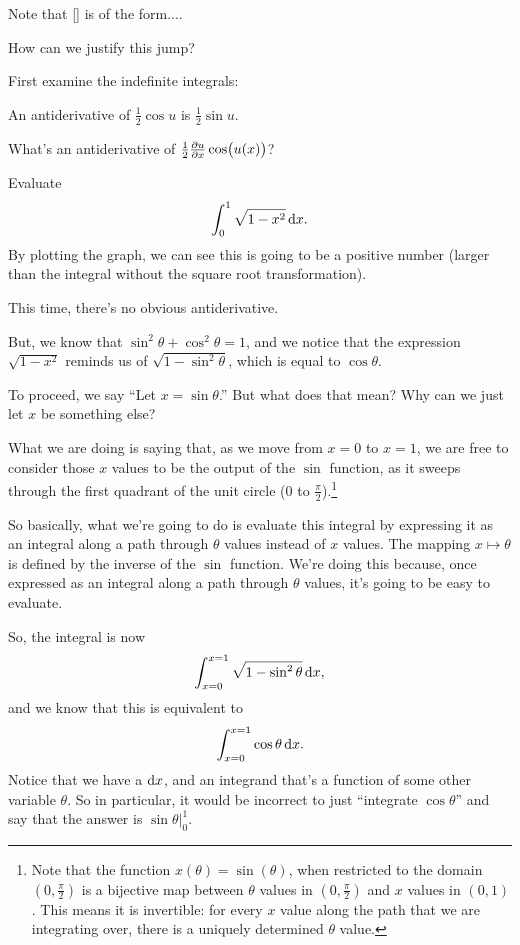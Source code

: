 \begin{example}
  Note that \eqref{} is of the form....

  How can we justify this jump?

  First examine the indefinite integrals:

  An antiderivative of $\frac{1}{2}\cos u$ is $\frac{1}{2}\sin u$.

  What's an antiderivative of $\frac{1}{2} \frac{\partial u}{\partial x} \cos(u(x))$?
\end{example}



\begin{example}
  Evaluate
  \begin{align*}
     \int _{0}^{1} \sqrt {1-x^{2}} \dx.
  \end{align*}
  By plotting the graph, we can see this is going to be a positive number (larger than the integral
  without the square root transformation).

  This time, there's no obvious antiderivative.

  But, we know that $\sin^2 \theta + \cos^2 \theta = 1$, and we notice that the expression
  $\sqrt{1 - x^2}$ reminds us of $\sqrt{1 - \sin^2 \theta}$, which is equal to $\cos \theta$.

  To proceed, we say ``Let $x = \sin \theta$.'' But what does that mean? Why can we just let $x$ be something else?

  What we are doing is saying that, as we move from $x=0$ to $x = 1$, we are free to consider those
  $x$ values to be the output of the $\sin$ function, as it sweeps through the first quadrant of the
  unit circle ($0$ to $\frac{\pi}{2}$).\footnote{Note that the function $x(\theta) = \sin(\theta)$, when restricted to the domain
    $(0, \frac{\pi}{2})$ is a bijective map between $\theta$ values in $(0, \frac{\pi}{2})$ and $x$ values in
    $(0, 1)$. This means it is invertible: for every $x$ value along the path that we are integrating
    over, there is a uniquely determined $\theta$ value.}

  So basically, what we're going to do is evaluate this integral by expressing it as an integral along
  a path through $\theta$ values instead of $x$ values. The mapping $x \mapsto \theta$ is defined by the inverse of the
  $\sin$ function. We're doing this because, once expressed as an integral along a path through
  $\theta$ values, it's going to be easy to evaluate.

  So, the integral is now
  \begin{align*}
     \int _{x=0}^{x=1} \sqrt {1-\sin^{2} \theta} \dx,
  \end{align*}
  and we know that this is equivalent to
  \begin{align*}
     \int _{x=0}^{x=1} \cos \theta \dx.
  \end{align*}
  Notice that we have a $\dx$, and an integrand that's a function of some other variable $\theta$. So in
  particular, it would be incorrect to just ``integrate $\cos \theta$'' and say that the answer is
  $\sin \theta\Big|_0^1$.


\end{example}
